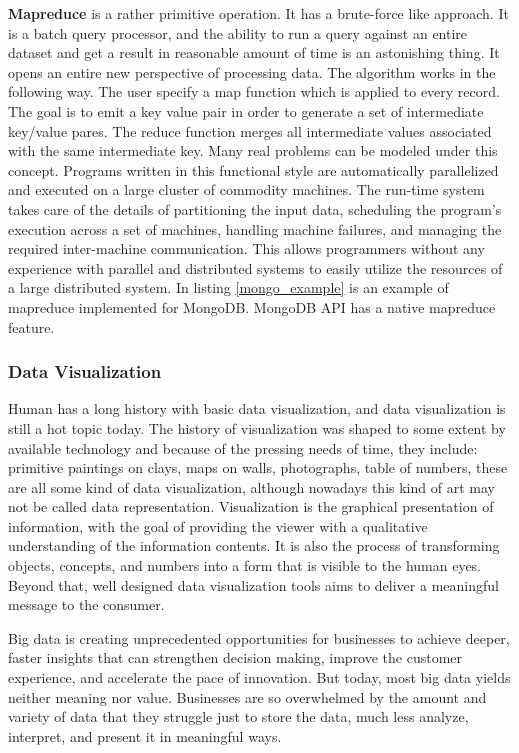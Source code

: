 \textbf{Mapreduce} is a rather primitive operation. It has a brute-force like approach. It is a batch query processor, and the ability to run a query against an entire dataset and get a result in reasonable amount of time is an astonishing thing. It opens an entire new perspective of processing data. The algorithm works in the following way. The user specify a map function which is applied to every record. The goal is to emit a key value pair in order to generate a set of intermediate key/value pares. The reduce function merges all intermediate values associated with the same intermediate key. Many real problems can be modeled under this concept. Programs written in this functional style are automatically parallelized and executed on a large cluster of commodity machines. The run-time system takes care of the details of partitioning the input data, scheduling the program's execution across a set of machines, handling machine failures, and managing the required inter-machine communication. This allows programmers without any experience with parallel and distributed systems to easily utilize the resources of a large distributed system. In listing \mbox{\ref{mongo_example}} is an example of mapreduce implemented for MongoDB. MongoDB API has a native mapreduce feature.



\subsubsection{Data Visualization}
Human has a long history with basic data visualization, and data visualization is still a hot topic today. The history of visualization was shaped to some extent by available technology and because of the pressing needs of time, they include: primitive paintings on clays, maps on walls, photographs, table of numbers, these are all some kind of data visualization, although nowadays this kind of art may not be called data representation. Visualization is the graphical presentation of information, with the goal of providing the viewer with a qualitative understanding of the information contents. It is also the process of transforming objects, concepts, and numbers into a form that is visible to the human eyes. Beyond that, well designed data visualization tools aims to deliver a meaningful message to the consumer.

Big data is creating unprecedented opportunities for businesses to achieve deeper, faster insights that can strengthen decision making, improve the customer experience, and accelerate the pace of innovation. But today, most big data yields neither meaning nor value. Businesses are so overwhelmed by the amount and variety of data that they struggle just to store the data, much less analyze, interpret, and present it in meaningful ways.

